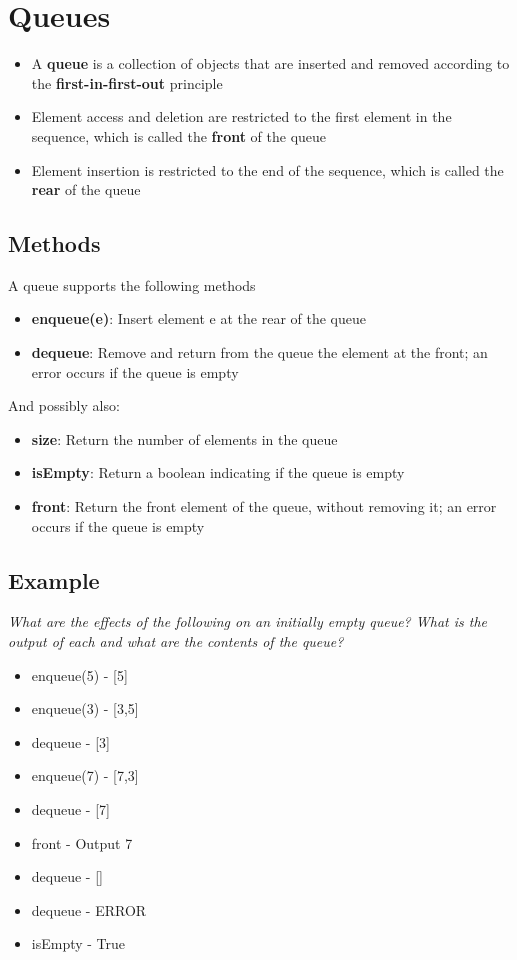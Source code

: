 \documentclass{article}[18pt]
\begin{document}
\section{Queues}
\begin{itemize}
\item A \textbf{queue} is a collection of objects that are inserted and removed according to the \textbf{first-in-first-out} principle
\item Element access and deletion are restricted to the first element in the sequence, which is called the \textbf{front} of the queue
\item Element insertion is restricted to the end of the sequence, which is called the \textbf{rear} of the queue
\end{itemize}
\subsection{Methods}
A queue supports the following methods
\begin{itemize}
\item \textbf{enqueue(e)}: Insert element e at the rear of the queue
\item \textbf{dequeue}: Remove and return from the queue the element at the front; an error occurs if the queue is empty
\end{itemize}
And possibly also:
\begin{itemize}
\item \textbf{size}: Return the number of elements in the queue
\item \textbf{isEmpty}: Return a boolean indicating if the queue is empty
\item \textbf{front}: Return the front element of the queue, without removing it; an error occurs if the queue is empty
\end{itemize}
\subsection{Example}
\textit{What are the effects of the following on an initially empty queue? What is the output of each and what are the contents of the queue?}
\begin{itemize}
\item enqueue(5) - [5]
\item enqueue(3) - [3,5]
\item dequeue - [3]
\item enqueue(7) - [7,3]
\item dequeue - [7]
\item front - Output 7
\item dequeue - []
\item dequeue - ERROR
\item isEmpty - True
\end{itemize}
\end{document}
